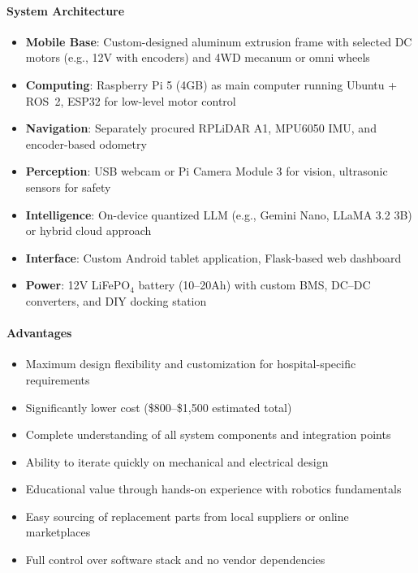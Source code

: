 \paragraph{System Architecture}
\begin{itemize}
    \item \textbf{Mobile Base}: Custom-designed aluminum extrusion frame with selected DC motors (e.g., 12V with encoders) and 4WD mecanum or omni wheels
    \item \textbf{Computing}: Raspberry Pi 5 (4GB) as main computer running Ubuntu + ROS~2, ESP32 for low-level motor control
    \item \textbf{Navigation}: Separately procured RPLiDAR A1, MPU6050 IMU, and encoder-based odometry
    \item \textbf{Perception}: USB webcam or Pi Camera Module 3 for vision, ultrasonic sensors for safety
    \item \textbf{Intelligence}: On-device quantized LLM (e.g., Gemini Nano, LLaMA 3.2 3B) or hybrid cloud approach
    \item \textbf{Interface}: Custom Android tablet application, Flask-based web dashboard
    \item \textbf{Power}: 12V LiFePO$_4$ battery (10--20Ah) with custom BMS, DC--DC converters, and DIY docking station
\end{itemize}

\paragraph{Advantages}
\begin{itemize}
    \item Maximum design flexibility and customization for hospital-specific requirements
    \item Significantly lower cost (\$800--\$1,500 estimated total)
    \item Complete understanding of all system components and integration points
    \item Ability to iterate quickly on mechanical and electrical design
    \item Educational value through hands-on experience with robotics fundamentals
    \item Easy sourcing of replacement parts from local suppliers or online marketplaces
    \item Full control over software stack and no vendor dependencies
\end{itemize}

